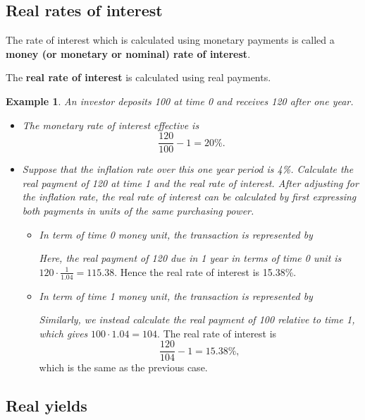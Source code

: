 \documentclass[
]{book}
\theoremstyle{definition}
\theoremstyle{definition}
\newtheorem{example}{Example}[chapter]
\theoremstyle{definition}
\theoremstyle{definition}
\theoremstyle{remark}
\begin{document}
\subsection{Real rates of interest}\label{real-rates-of-interest}

The rate of interest which is calculated using monetary payments is
called a \textbf{money (or monetary or nominal) rate of interest}.

The \textbf{real rate of interest} is calculated using real payments.

\begin{example}

\emph{An investor deposits 100 at time 0 and receives 120 after one year.}

\begin{itemize}
\item
  \emph{The monetary rate of interest effective is}
  \[\frac{120}{100} - 1 = 20\%.\]
\item
  \emph{Suppose that the inflation rate over this one year period is 4\%.
  Calculate the real payment of 120 at time 1 and the real rate of
  interest. After adjusting for the inflation rate, the real rate of
  interest can be calculated by first expressing both payments in
  units of the same purchasing power.}

  \begin{itemize}
  \item
    \emph{In term of time 0 money unit, the transaction is represented
    by}

    \emph{Here, the real payment of 120 due in 1 year in terms of time 0
    unit is} \(\displaystyle{120 \cdot \frac{1}{1.04} = 115.38}\).
    Hence the real rate of interest is 15.38\%.
  \item
    \emph{In term of time 1 money unit, the transaction is represented
    by}

    \emph{Similarly, we instead calculate the real payment of 100
    relative to time 1, which gives} \(100 \cdot 1.04 = 104\). The
    real rate of interest is \[\frac{120}{104} - 1 = 15.38\%,\]
    which is the same as the previous case.
  \end{itemize}
\end{itemize}

\end{example}

\subsection{Real yields}\label{real-yields}
\end{document}
